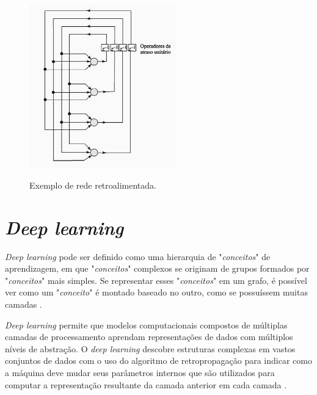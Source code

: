 \begin{itemize}
\begin{figure}[H]
  \centering
  \caption{Exemplo de rede retroalimentada.}
  \includegraphics[width=180pt]{dados/figuras/retroalimentacao}
  \label{fig:retroalimentacao}
\end{figure}
\end{itemize}
\section{\textit{Deep learning}}
\textit{Deep learning} pode ser definido como uma hierarquia de "\textit{conceitos}" de aprendizagem, em que "\textit{conceitos}" complexos se originam de grupos formados por "\textit{conceitos}" mais simples. Se representar esses "\textit{conceitos}" em um grafo, é possível ver como um "\textit{conceito}" é montado baseado no outro, como se possuíssem muitas camadas \cite{Goodfellow-et-al-2016}.

\begin{citacao}
    \textit{Deep learning} permite que modelos computacionais compostos de múltiplas camadas de processamento aprendam representações de dados com múltiplos níveis de abstração.
   O  \textit{deep learning} descobre estruturas complexas em vastos conjuntos de dados com o uso do algoritmo de retropropagação para indicar como a máquina deve mudar seus parâmetros internos que são utilizados para computar a representação resultante da camada anterior em cada camada \cite{lecun2015deep}.
\end{citacao}

